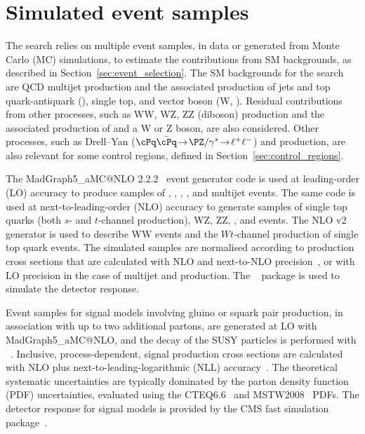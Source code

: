 \section{Simulated event samples}
\label{sec:simulation}

The search relies on multiple event samples, in data or generated from
Monte Carlo (MC) simulations, to estimate the contributions from SM
backgrounds, as described in Section~\ref{sec:event_selection}. 
The SM backgrounds for the search are QCD multijet production and the
associated production of jets and top quark-antiquark (\ttbar), single
top, and vector boson (W, \znunu). Residual contributions from other
processes, such as WW, WZ, ZZ (diboson) production and the associated
production of \ttbar and a W or Z boson, are also considered. Other
processes, such as Drell--Yan ($\cPq\bar{\cPq}\!  \rightarrow\!
\PZ/\gamma^*\!  \rightarrow\!  \ell^+\ell^-$) and \gj production, are
also relevant for some control regions, defined in
Section~\ref{sec:control_regions}.

The {\sc MadGraph5\_aMC@NLO} 2.2.2~\cite{Alwall2014} event generator
code is used at leading-order (LO) accuracy to produce samples of \wj,
\zj, \gj, \ttbar, and multijet events. The same code is used at
next-to-leading-order (NLO) accuracy to generate samples of single top
quarks (both $s$- and $t$-channel production), WZ, ZZ, \ttw, and \ttz
events. The NLO \POWHEG v2~\cite{powheg, powheg_top_Wt} generator is
used to describe WW events and the $Wt$-channel production of single top
quark events. The simulated samples are normalised according to
production cross sections that are calculated with NLO and next-to-NLO
precision~\cite{Alwall2014, wphys, fewz, wwxs, top++, nlotop,
  powheg_top_Wt}, or with LO precision in the case of multijet and \gj
production.  The \GEANTfour~\cite{geant} package is used to simulate
the detector response.

Event samples for signal models involving gluino or squark pair
production, in association with up to two additional partons, are
generated at LO with {\sc MadGraph5\_aMC@NLO}, and the
decay of the SUSY particles is performed with ~\cite{pythia}. Inclusive, process-dependent, signal production
cross sections are calculated with NLO plus
next-to-leading-logarithmic (NLL) accuracy~\cite{Beenakker:1996ch,
  PhysRevLett.102.111802, PhysRevD.80.095004, 1126-6708-2009-12-041,
  doi:10.1142/S0217751X11053560, susynlo}. The theoretical systematic
uncertainties are typically dominated by the parton density function
(PDF) uncertainties, evaluated using the
CTEQ6.6~\cite{Nadolsky:2008zw} and MSTW2008~\cite{Martin:2009iq} PDFs.
The detector response for signal models is provided by the CMS fast
simulation package~\cite{fastsim}.

